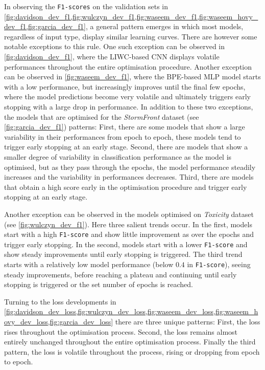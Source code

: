 In observing the \texttt{F1-scores} on the validation sets in \cref{fig:davidson_dev_f1,fig:wulczyn_dev_f1,fig:waseem_dev_f1,fig:waseem_hovy_dev_f1,fig:garcia_dev_f1}, a general pattern emerges in which most models, regardless of input type, display similar learning curves.
There are however some notable exceptions to this rule.
One such exception can be observed in \cref{fig:davidson_dev_f1}, where the LIWC-based CNN displays volatile performances throughout the entire optimisation procedure.
Another exception can be observed in \cref{fig:waseem_dev_f1}, where the BPE-based MLP model starts with a low performance, but increasingly improves until the final few epochs, where the model predictions become very volatile and ultimately triggers early stopping with a large drop in performance.
In addition to these two exceptions, the models that are optimised for the \textit{StormFront} dataset (see \cref{fig:garcia_dev_f1})  patterns:
First, there are some models that show a large variability in their performances from epoch to epoch, these models tend to trigger early stopping at an early stage.
Second, there are models that show a smaller degree of variability in classification performance as the model is optimised, but as they pass through the epochs, the model performance steadily increases and the variability in performances decreases.
Third, there are models that obtain a high score early in the optimisation procedure and trigger early stopping at an early stage.

Another exception can be observed in the models optimised on \textit{Toxicity} dataset (see \cref{fig:wulczyn_dev_f1}).
Here three salient trends occur.
In the first, models start with a high \texttt{F1-score} and show little improvement as over the epochs and trigger early stopping.
In the second, models start with a lower \texttt{F1-score} and show steady improvements until early stopping is triggered.
The third trend starts with a relatively low model performance (below $0.4$ in \texttt{F1-score}), seeing steady improvements, before reaching a plateau and continuing until early stopping is triggered or the set number of epochs is reached.

Turning to the loss developments in \cref{fig:davidson_dev_loss,fig:wulczyn_dev_loss,fig:waseem_dev_loss,fig:waseem_hovy_dev_loss,fig:garcia_dev_loss} there are three unique patterns: 
First, the loss rises throughout the optimisation process.
Second, the loss remains almost entirely unchanged throughout the entire optimisation process. 
Finally the third pattern, the loss is volatile throughout the process, rising or dropping from epoch to epoch.

